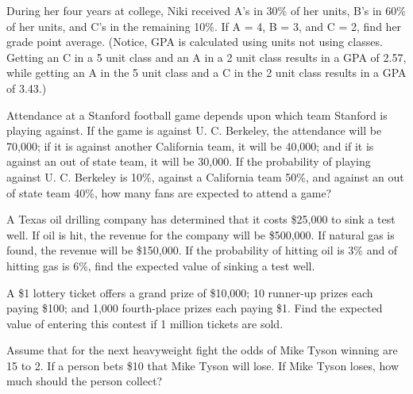 \begin{puzzle}
    During her four years at college, Niki received A's in 30\% of her units, B's in 60\% of her units, and C's in the remaining 10\%. If A = 4, B = 3, and C = 2, find her grade point average. (Notice, GPA is calculated using units not using classes. Getting an C in a 5 unit class and an A in a 2 unit class results in a GPA of 2.57, while getting an A in the 5 unit class and a C in the 2 unit class results in a GPA of 3.43.)
\end{puzzle}

\begin{puzzle}
    Attendance at a Stanford football game depends upon which team Stanford is playing against. If the game is against U. C. Berkeley, the attendance will be 70,000; if it is against another California team, it will be 40,000; and if it is against an out of state team, it will be 30,000. If the probability of playing against U. C. Berkeley is 10\%, against a California team 50\%, and against an out of state team 40\%, how many fans are expected to attend a game?
\end{puzzle}

\begin{puzzle}
    A Texas oil drilling company has determined that it costs \$25,000 to sink a test well. If oil is hit, the revenue for the company will be \$500,000. If natural gas is found, the revenue will be \$150,000. If the probability of hitting oil is 3\% and of hitting gas is 6\%, find the expected value of sinking a test well.
\end{puzzle}

\begin{puzzle}
    A \$1 lottery ticket offers a grand prize of \$10,000; 10 runner-up prizes each paying \$100; and 1,000 fourth-place prizes each paying \$1. Find the expected value of entering this contest if 1 million tickets are sold.
\end{puzzle}

\begin{puzzle}
    Assume that for the next heavyweight fight the odds of Mike Tyson winning are 15 to 2. If a person bets \$10 that Mike Tyson will lose. If Mike Tyson loses, how much should the person collect?
\end{puzzle}


